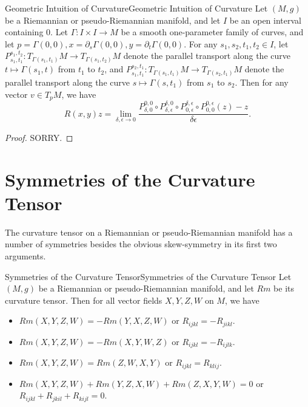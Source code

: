 \documentclass[../main.tex]{subfiles}
\begin{document}
\begin{theorem}{Geometric Intuition of Curvature}{Geometric Intuition of Curvature}
	Let $(M, g)$ be a Riemannian or pseudo-Riemannian manifold, and let $I$ be an open interval containing $0$. Let $\Gamma: I \times I \to M$ be a smooth one-parameter family of curves, and let $p = \Gamma(0, 0), x = \partial_s \Gamma(0, 0), y = \partial_t \Gamma(0, 0)$. For any $s_1,s_2,t_1,t_2 \in I$, let $P_{s_1, t_1}^{s_1, t_2}: T_{\Gamma(s_1, t_1)} M \to T_{\Gamma(s_1, t_2)} M$ denote the parallel transport along the curve $t \mapsto \Gamma(s_1, t)$ from $t_1$ to $t_2$, and $P_{s_1, t_1}^{s_2, t_1}: T_{\Gamma(s_1, t_1)} M \to T_{\Gamma(s_2, t_1)} M$ denote the parallel transport along the curve $s \mapsto \Gamma(s, t_1)$ from $s_1$ to $s_2$. Then for any vector $v \in T_p M$, we have
	\begin{equation}
		R(x, y)z = \lim_{\delta, \epsilon \to 0} \frac{P_{\delta, 0}^{0, 0} \circ P_{\delta, \epsilon}^{\delta, 0} \circ P_{0, \epsilon}^{\delta, \epsilon} \circ P_{0, 0}^{0, \epsilon} (z) - z}{\delta \epsilon}.
	\end{equation}
\end{theorem}
\begin{proof}
	SORRY.
\end{proof}

\section{Symmetries of the Curvature Tensor}
The curvature tensor on a Riemannian or pseudo-Riemannian manifold has a number of symmetries besides the obvious skew-symmetry in its first two arguments.

\begin{proposition}{Symmetries of the Curvature Tensor}{Symmetries of the Curvature Tensor}
	Let $(M, g)$ be a Riemannian or pseudo-Riemannian manifold, and let $Rm$ be its curvature tensor. Then for all vector fields $X, Y, Z, W$ on $M$, we have
	\begin{itemize}
		\item $Rm(X, Y, Z, W) = - Rm(Y, X, Z, W)$ or $R_{ijkl} = - R_{jikl}$.
		\item $Rm(X, Y, Z, W) = - Rm(X, Y, W, Z)$ or $R_{ijkl} = - R_{ijlk}$.
		\item $Rm(X, Y, Z, W) = Rm(Z, W, X, Y)$ or $R_{ijkl} = R_{klij}$.
		\item $Rm(X, Y, Z, W) + Rm(Y, Z, X, W) + Rm(Z, X, Y, W) = 0$ or $R_{ijkl} + R_{jkil} + R_{kijl} = 0$.
	\end{itemize}
\end{proposition}
\end{document}
